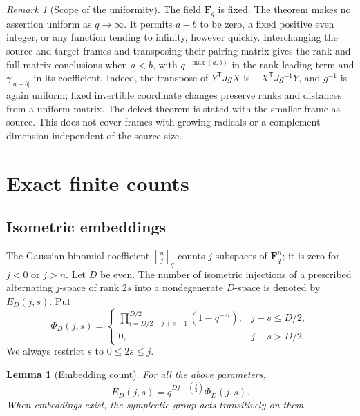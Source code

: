 \documentclass[11pt,letterpaper]{article}
\newtheorem{lemma}[theorem]{Lemma}
\theoremstyle{remark}
\newtheorem{remark}[theorem]{Remark}
\newcommand{\F}{\mathbf F}
\newcommand{\qb}[2]{\genfrac{[}{]}{0pt}{}{#1}{#2}_{q}}
\begin{document}
\begin{remark}[Scope of the uniformity]
The field $\F_q$ is fixed. The theorem makes no assertion uniform as
$q\to\infty$. It permits $a-b$ to be zero, a fixed positive even integer,
or any function tending to infinity, however quickly. Interchanging the
source and target frames and transposing their pairing matrix gives the
rank and full-matrix conclusions when $a<b$, with $q^{-\max(a,b)}$ in the rank leading term
and $\gamma_{|a-b|}$ in its coefficient. Indeed, the transpose of
$Y^{\mathsf T}JgX$ is $-X^{\mathsf T}Jg^{-1}Y$, and $g^{-1}$ is again
uniform; fixed invertible coordinate changes preserve ranks and distances
from a uniform matrix. The defect theorem is stated with the smaller
frame as source. This does not cover frames with
growing radicals or a complement dimension independent of the source size.
\end{remark}

\section{Exact finite counts}

\subsection{Isometric embeddings}

The Gaussian binomial coefficient $\qb nj$ counts $j$-subspaces of $\F_q^n$;
it is zero for $j<0$ or $j>n$. Let $D$ be even. The number of isometric
injections of a prescribed alternating $j$-space of rank $2s$ into a
nondegenerate $D$-space is denoted by $E_D(j,s)$.
Put
\begin{equation}\label{eq:phi}
 \Phi_D(j,s)=
 \begin{cases}
 \displaystyle\prod_{i=D/2-j+s+1}^{D/2}(1-q^{-2i}),&j-s\le D/2,\\
 0,&j-s>D/2.
 \end{cases}
\end{equation}
We always restrict $s$ to $0\le2s\le j$.

\begin{lemma}[Embedding count]\label{lem:embedding}
For all the above parameters,
\begin{equation}\label{eq:embedding}
 E_D(j,s)=q^{Dj-\binom j2}\Phi_D(j,s).
\end{equation}
When embeddings exist, the symplectic group acts transitively on them.
\end{lemma}
\end{document}
